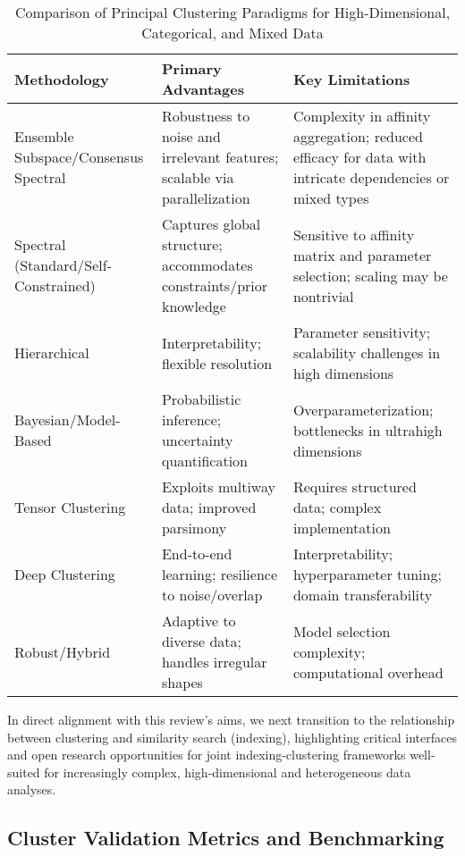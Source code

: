 \documentclass[sigconf]{acmart}
\begin{document}
\begin{table*}[htbp]
\centering
\caption{Comparison of Principal Clustering Paradigms for High-Dimensional, Categorical, and Mixed Data}
\label{tab:clustering_methods_comparison}
\begin{adjustbox}{max width=\textwidth}
\begin{tabular}{lll}
\toprule
\textbf{Methodology} & \textbf{Primary Advantages} & \textbf{Key Limitations} \\
\midrule
Ensemble Subspace/Consensus Spectral & Robustness to noise and irrelevant features; scalable via parallelization & Complexity in affinity aggregation; reduced efficacy for data with intricate dependencies or mixed types \\
Spectral (Standard/Self-Constrained) & Captures global structure; accommodates constraints/prior knowledge & Sensitive to affinity matrix and parameter selection; scaling may be nontrivial \\
Hierarchical & Interpretability; flexible resolution & Parameter sensitivity; scalability challenges in high dimensions \\
Bayesian/Model-Based & Probabilistic inference; uncertainty quantification & Overparameterization; bottlenecks in ultrahigh dimensions \\
Tensor Clustering & Exploits multiway data; improved parsimony & Requires structured data; complex implementation \\
Deep Clustering & End-to-end learning; resilience to noise/overlap & Interpretability; hyperparameter tuning; domain transferability \\
Robust/Hybrid & Adaptive to diverse data; handles irregular shapes & Model selection complexity; computational overhead \\
\bottomrule
\end{tabular}
\end{adjustbox}
\end{table*}

In direct alignment with this review’s aims, we next transition to the relationship between clustering and similarity search (indexing), highlighting critical interfaces and open research opportunities for joint indexing-clustering frameworks well-suited for increasingly complex, high-dimensional and heterogeneous data analyses.

\subsection{Cluster Validation Metrics and Benchmarking}
\end{document}
